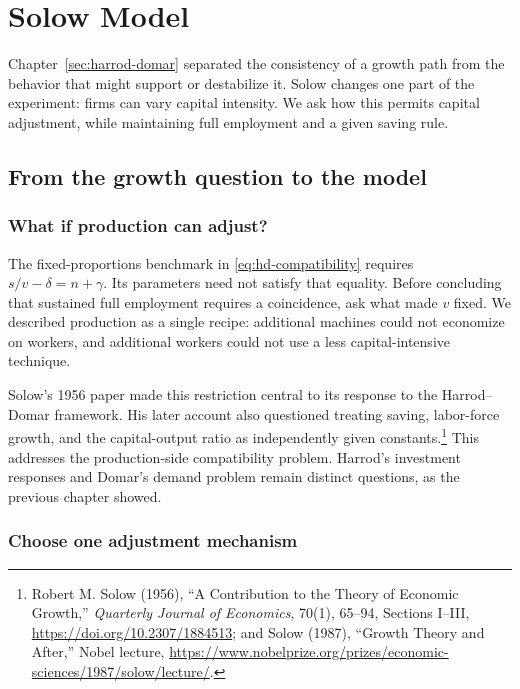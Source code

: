 \section{Solow Model}\label{sec:solow}

Chapter~\ref{sec:harrod-domar} separated the consistency of a growth path from
the behavior that might support or destabilize it. Solow changes one part of
the experiment: firms can vary capital intensity. We ask how this permits
capital adjustment, while maintaining full employment and a given saving rule.

\subsection{From the growth question to the model}\label{sec:solow-motivation}

\subsubsection{What if production can adjust?}

The fixed-proportions benchmark in \eqref{eq:hd-compatibility} requires
$s/v-\delta=n+\gamma$. Its parameters need not satisfy that equality. Before
concluding that sustained full employment requires a coincidence, ask what
made $v$ fixed. We described production as a single recipe: additional machines
could not economize on workers, and additional workers could not use a less
capital-intensive technique.

Solow's 1956 paper made this restriction central to its response to the
Harrod--Domar framework. His later account also questioned treating saving,
labor-force growth, and the capital-output ratio as independently given
constants.\footnote{Robert M. Solow (1956), ``A Contribution to the Theory of
Economic Growth,'' \textit{Quarterly Journal of Economics}, 70(1), 65--94,
Sections I--III, \url{https://doi.org/10.2307/1884513}; and Solow (1987),
``Growth Theory and After,'' Nobel lecture,
\url{https://www.nobelprize.org/prizes/economic-sciences/1987/solow/lecture/}.}
This addresses the production-side compatibility problem. Harrod's investment
responses and Domar's demand problem remain distinct questions, as the previous
chapter showed.

\subsubsection{Choose one adjustment mechanism}

